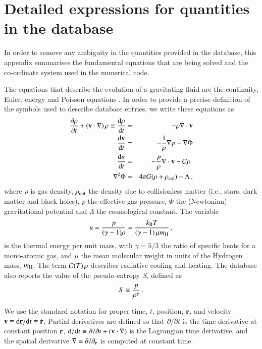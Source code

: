 \section{Detailed expressions for quantities in the database}
\label{appendix_cosmo}
In order to remove any ambiguity in the quantities provided in the database, this appendix summarises the fundamental equations that are being solved and the co-ordinate system used in the numerical code. 

The equations that describe the evolution of a gravitating fluid are the continuity, Euler, energy and Poisson equations \citep{Peebles1980}. In order to provide a precise definition of the symbols used to describe database entries, we write these equations as 
\begin{eqnarray}
\frac{\partial\rho}{\partial t} + ({\bf v}\cdot \nabla)\,\rho \equiv {{\rm d}\rho\over {\rm d}t}&=&-\rho\nabla\cdot {\bf v}\label{eq:cont}\\
{{\rm d}{\bf v}\over {\rm d}t}&=&-\frac{1}{\rho}\nabla p-\nabla\Phi\label{eq:euler}\\
{{\rm d}u\over {\rm d}t}&=& -{p\over \rho}\nabla\cdot{\bf v}
-{\cal C}\rho\,\,\\
\nabla^2\Phi  &=&4\pi G (\rho+\rho_{\rm col}) - \Lambda\,,
\label{eq:CEP}
\end{eqnarray}
where $\rho$ is gas density, $\rho_{\rm col}$ the density due to collisionless matter (i.e., stars, dark matter and black holes), $p$ the effective gas pressure, $\Phi$ the (Newtonian) gravitational potential and $\Lambda$ the cosmological constant. The variable
\begin{equation}
u = {p\over (\gamma-1)\rho} = {k_{\rm B}T\over (\gamma-1)\,\mu m_{\rm H}}\,, 
\label{eq:u}
\end{equation}
is the thermal energy per unit mass, with $\gamma=5/3$ the ratio of specific heats for a mono-atomic gas,
and $\mu$ the mean molecular weight in units of the Hydrogen mass, $m_{\rm H}$. The term ${\cal C}(T)\,\rho$ describes radiative cooling and heating.
The database also reports the value of the pseudo-entropy $S$, defined as
\begin{equation}
S \equiv {p\over\rho^\gamma}\,.
\label{eq:S}
\end{equation}

We use the standard notation for proper time, $t$, position, ${\bf r}$, and velocity ${\bf v}\equiv {\rm d}{\bf r}/{\rm d}t\equiv \dot{\bf r}$. Partial derivatives are defined so that $\partial/\partial t$ is the time derivative at constant position ${\bf r}$,
${\rm d}/{\rm d}t\equiv \partial/\partial t + ({\bf v}\cdot\nabla)$ is the Lagrangian time derivative, and the spatial derivative $\nabla\equiv \partial/\partial_{\bf r}$ is computed at constant time.

